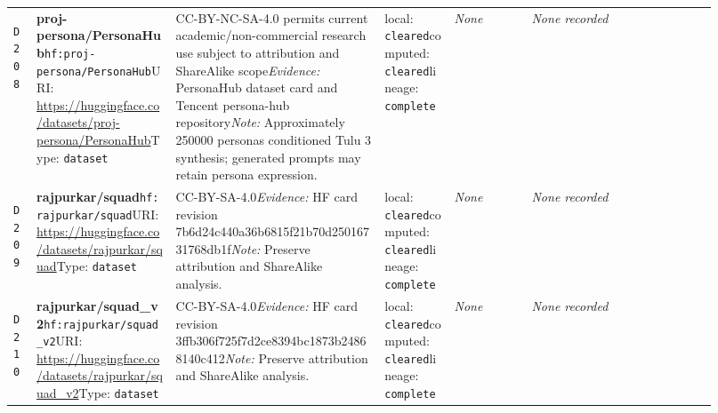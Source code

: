 \documentclass[9pt,a4paper]{article}
\newcommand{\depid}[1]{\hypertarget{dep:#1}{\texttt{#1}}}
\begin{document}
\begin{landscape}
\begin{longtable}{@{}L{0.035\linewidth}L{0.185\linewidth}L{0.27\linewidth}L{0.09\linewidth}L{0.10\linewidth}L{0.24\linewidth}@{}}
\depid{D208} & \textbf{proj-persona/PersonaHub}\newline \nolinkurl{hf:proj-persona/PersonaHub}\newline URI: \url{https://huggingface.co/datasets/proj-persona/PersonaHub}\newline Type: \texttt{dataset} & CC-BY-NC-SA-4.0 permits current academic/non-commercial research use subject to attribution and ShareAlike scope\newline \textit{Evidence:} PersonaHub dataset card and Tencent persona-hub repository\newline \textit{Note:} Approximately 250000 personas conditioned Tulu 3 synthesis; generated prompts may retain persona expression. & local: \texttt{cleared}\newline computed: \texttt{cleared}\newline lineage: \texttt{complete} & \textit{None} & \textit{None recorded} \\
\depid{D209} & \textbf{rajpurkar/squad}\newline \nolinkurl{hf:rajpurkar/squad}\newline URI: \url{https://huggingface.co/datasets/rajpurkar/squad}\newline Type: \texttt{dataset} & CC-BY-SA-4.0\newline \textit{Evidence:} HF card revision 7b6d24c440a36b6815f21b70d25016731768db1f\newline \textit{Note:} Preserve attribution and ShareAlike analysis. & local: \texttt{cleared}\newline computed: \texttt{cleared}\newline lineage: \texttt{complete} & \textit{None} & \textit{None recorded} \\
\depid{D210} & \textbf{rajpurkar/squad\_v2}\newline \nolinkurl{hf:rajpurkar/squad_v2}\newline URI: \url{https://huggingface.co/datasets/rajpurkar/squad_v2}\newline Type: \texttt{dataset} & CC-BY-SA-4.0\newline \textit{Evidence:} HF card revision 3ffb306f725f7d2ce8394bc1873b24868140c412\newline \textit{Note:} Preserve attribution and ShareAlike analysis. & local: \texttt{cleared}\newline computed: \texttt{cleared}\newline lineage: \texttt{complete} & \textit{None} & \textit{None recorded} \\

\end{longtable}
\end{landscape}
\end{document}
